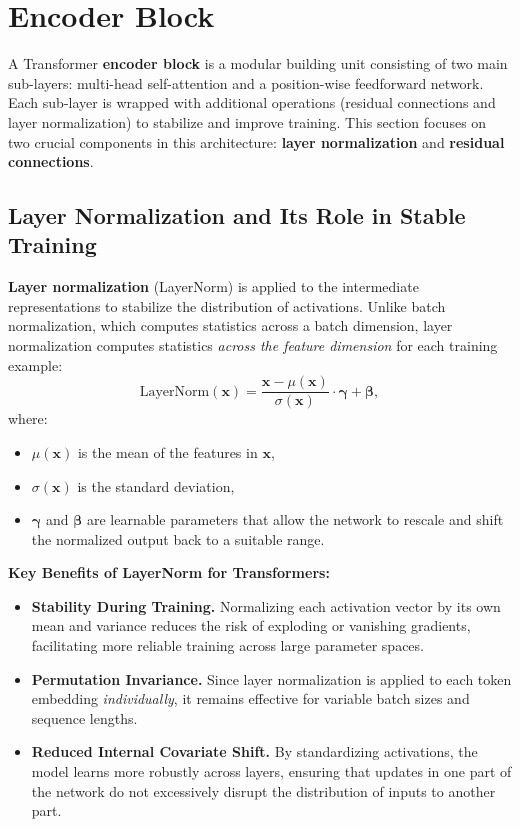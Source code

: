 \section{Encoder Block}
\label{sec:encoder_block}

\noindent
A Transformer \textbf{encoder block} is a modular building unit consisting of two main sub-layers: multi-head self-attention and a position-wise feedforward network. Each sub-layer is wrapped with additional operations (residual connections and layer normalization) to stabilize and improve training. This section focuses on two crucial components in this architecture: \textbf{layer normalization} and \textbf{residual connections}.

\subsection{Layer Normalization and Its Role in Stable Training}
\noindent
\textbf{Layer normalization} (LayerNorm) is applied to the intermediate representations to stabilize the distribution of activations. Unlike batch normalization, which computes statistics across a batch dimension, layer normalization computes statistics \emph{across the feature dimension} for each training example:
\[
\text{LayerNorm}(\mathbf{x}) 
= \frac{\mathbf{x} - \mu(\mathbf{x})}{\sigma(\mathbf{x})} \cdot \boldsymbol{\gamma} + \boldsymbol{\beta},
\]
where:
\begin{itemize}
    \item $\mu(\mathbf{x})$ is the mean of the features in $\mathbf{x}$,
    \item $\sigma(\mathbf{x})$ is the standard deviation,
    \item $\boldsymbol{\gamma}$ and $\boldsymbol{\beta}$ are learnable parameters that allow the network to rescale and shift the normalized output back to a suitable range.
\end{itemize}

\noindent
\textbf{Key Benefits of LayerNorm for Transformers:}
\begin{itemize}
    \item \textbf{Stability During Training.} Normalizing each activation vector by its own mean and variance reduces the risk of exploding or vanishing gradients, facilitating more reliable training across large parameter spaces.
    \item \textbf{Permutation Invariance.} Since layer normalization is applied to each token embedding \emph{individually}, it remains effective for variable batch sizes and sequence lengths.
    \item \textbf{Reduced Internal Covariate Shift.} By standardizing activations, the model learns more robustly across layers, ensuring that updates in one part of the network do not excessively disrupt the distribution of inputs to another part.
\end{itemize}

